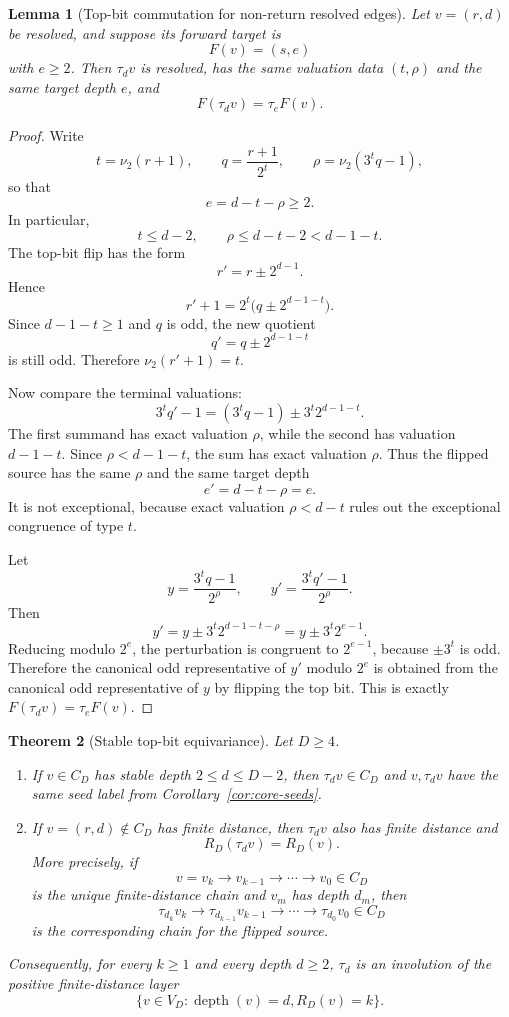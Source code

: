 \documentclass[11pt]{article}
\newtheorem{theorem}{Theorem}[section]
\newtheorem{lemma}[theorem]{Lemma}
\theoremstyle{definition}
\theoremstyle{remark}
\newcommand{\nuu}{\nu_2}
\newcommand{\depth}{\operatorname{depth}}
\begin{document}
\begin{lemma}[Top-bit commutation for non-return resolved edges]\label{lem:top-bit-commute-edge}
Let $v=(r,d)$ be resolved, and suppose its forward target is
\[
F(v)=(s,e)
\]
with $e\ge2$.  Then $\tau_dv$ is resolved, has the same valuation data $(t,\rho)$ and the same target depth $e$, and
\[
F(\tau_dv)=\tau_eF(v).
\]
\end{lemma}

\begin{proof}
Write
\[
t=\nuu(r+1),\qquad q=\frac{r+1}{2^t},\qquad
\rho=\nuu(3^tq-1),
\]
so that
\[
e=d-t-\rho\ge2.
\]
In particular,
\[
t\le d-2,
\qquad
\rho\le d-t-2<d-1-t.
\]
The top-bit flip has the form
\[
r'=r\pm2^{d-1}.
\]
Hence
\[
r'+1=2^t\bigl(q\pm2^{d-1-t}\bigr).
\]
Since $d-1-t\ge1$ and $q$ is odd, the new quotient
\[
q'=q\pm2^{d-1-t}
\]
is still odd.  Therefore $\nuu(r'+1)=t$.

Now compare the terminal valuations:
\[
3^tq'-1=(3^tq-1)\pm3^t2^{d-1-t}.
\]
The first summand has exact valuation $\rho$, while the second has valuation $d-1-t$.  Since $\rho<d-1-t$, the sum has exact valuation $\rho$.  Thus the flipped source has the same $\rho$ and the same target depth
\[
e'=d-t-\rho=e.
\]
It is not exceptional, because exact valuation $\rho<d-t$ rules out the exceptional congruence of type $t$.

Let
\[
y=\frac{3^tq-1}{2^\rho},
\qquad
 y'=\frac{3^tq'-1}{2^\rho}.
\]
Then
\[
y'=y\pm3^t2^{d-1-t-\rho}=y\pm3^t2^{e-1}.
\]
Reducing modulo $2^e$, the perturbation is congruent to $2^{e-1}$, because $\pm3^t$ is odd.  Therefore the canonical odd representative of $y'$ modulo $2^e$ is obtained from the canonical odd representative of $y$ by flipping the top bit.  This is exactly $F(\tau_dv)=\tau_eF(v)$.
\end{proof}

\begin{theorem}[Stable top-bit equivariance]\label{thm:top-bit-equivariance}
Let $D\ge4$.
\begin{enumerate}
\item If $v\in C_D$ has stable depth $2\le d\le D-2$, then $\tau_dv\in C_D$ and $v,\tau_dv$ have the same seed label from Corollary~\ref{cor:core-seeds}.
\item If $v=(r,d)\notin C_D$ has finite distance, then $\tau_dv$ also has finite distance and
\[
R_D(\tau_dv)=R_D(v).
\]
More precisely, if
\[
v=v_k\to v_{k-1}\to\cdots\to v_0\in C_D
\]
is the unique finite-distance chain and $v_m$ has depth $d_m$, then
\[
\tau_{d_k}v_k\to\tau_{d_{k-1}}v_{k-1}\to\cdots\to\tau_{d_0}v_0\in C_D
\]
is the corresponding chain for the flipped source.
\end{enumerate}
Consequently, for every $k\ge1$ and every depth $d\ge2$, $\tau_d$ is an involution of the positive finite-distance layer
\[
\{v\in V_D:\depth(v)=d,
 R_D(v)=k\}.
\]
\end{theorem}
\end{document}

